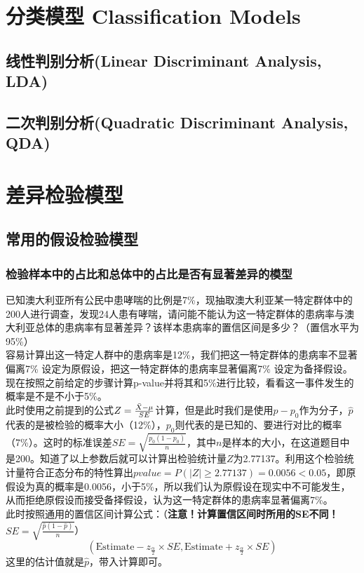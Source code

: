 \documentclass[UTF8]{ctexbook}
\begin{document}
\chapter{分类模型 Classification Models}
\section{线性判别分析(Linear Discriminant Analysis, LDA)}

\section{二次判别分析(Quadratic Discriminant Analysis, QDA)}

\chapter{差异检验模型}
\section{常用的假设检验模型}
\subsection{检验样本中的占比和总体中的占比是否有显著差异的模型}
已知澳大利亚所有公民中患哮喘的比例是7\%，现抽取澳大利亚某一特定群体中的200人进行调查，发现24人患有哮喘，请问能不能认为这一特定群体的患病率与澳大利亚总体的患病率有显著差异？该样本患病率的置信区间是多少？（置信水平为95\%）\\
\indent 容易计算出这一特定人群中的患病率是12\%，我们把这一特定群体的患病率不显著偏离7\% 设定为原假设，把这一特定群体的患病率显著偏离7\% 设定为备择假设。现在按照之前给定的步骤计算p-value并将其和5\%进行比较，看看这一事件发生的概率是不是不小于5\%。\\
\indent 此时使用之前提到的公式$Z=\frac{\Bar{X}-\mu}{SE}$计算，但是此时我们是使用$\hat{p}-p_0$作为分子，$\hat{p}$代表的是被检验的概率大小（12\%），$p_0$则代表的是已知的、要进行对比的概率（7\%）。这时的标准误差$SE=\sqrt{\frac{p_0\left(1-p_0\right)}{n}}$，其中$n$是样本的大小，在这道题目中是200。知道了以上参数后就可以计算出检验统计量$Z$为2.77137。利用这个检验统计量符合正态分布的特性算出$pvalue=P(|Z|\geq 2.77137)=0.0056<0.05$，即原假设为真的概率是0.0056，小于5\%，所以我们认为原假设在现实中不可能发生，从而拒绝原假设而接受备择假设，认为这一特定群体的患病率显著偏离7\%。\\
\indent 此时按照通用的置信区间计算公式：（\textbf{注意！计算置信区间时所用的SE不同！$SE=\sqrt{\frac{\hat{p}\left(1-\hat{p}\right)}{n}}$}）
\[
\left(\text{Estimate}-z_{\frac{\alpha}{2}}\times SE,\text{Estimate}+z_{\frac{\alpha}{2}}\times SE\right)
\]
\indent 这里的估计值就是$\hat{p}$，带入计算即可。
\end{document}
